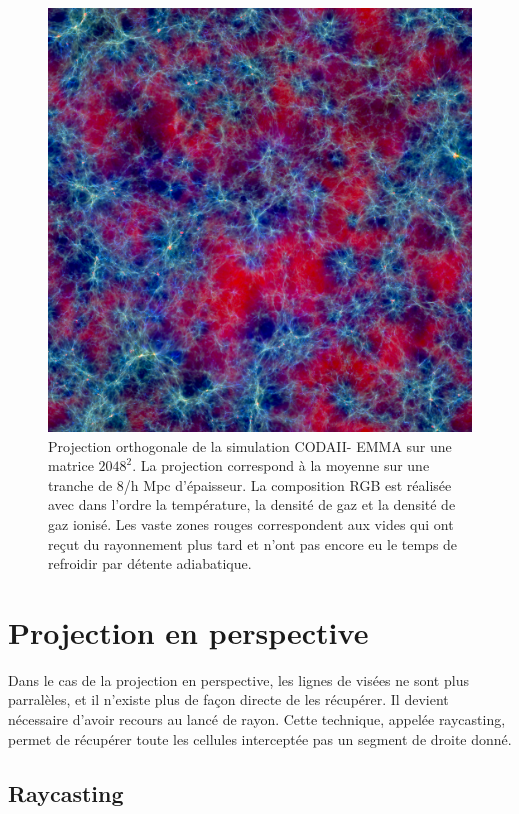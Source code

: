 \begin{figure}[bth]
        \includegraphics[width=.95\textwidth]{img/04/rgb-compose.jpeg} 
        \caption{Projection orthogonale de la simulation CODAII- EMMA sur une matrice $2048^2$.
        La projection correspond à la moyenne sur une tranche de 8/h Mpc d'épaisseur. 
        La composition RGB est réalisée avec dans l'ordre la température, la densité de gaz et la densité de gaz ionisé.
		Les vaste zones rouges correspondent aux vides qui ont reçut du rayonnement plus tard et n'ont pas encore eu le temps de refroidir par détente adiabatique.  
        }
 		\label{fig:ortho}
\end{figure}


\clearpage
\section{Projection en perspective}

Dans le cas de la projection en perspective, les lignes de visées ne sont plus parralèles, et il n'existe plus de façon directe de les récupérer.
Il devient nécessaire d'avoir recours au lancé de rayon.
Cette technique, appelée raycasting, permet de récupérer toute les cellules interceptée pas un segment de droite donné.

\subsection{Raycasting}
